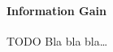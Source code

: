 \paragraph{Information Gain}
\label{par:methods.flat.filter.information_gain}

  
TODO
Bla bla bla\ldots
  
